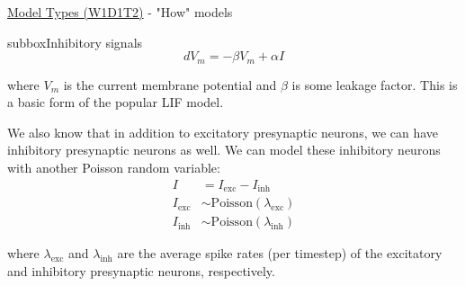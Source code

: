 \begin{textbox}{\href{https://compneuro.neuromatch.io/tutorials/W1D1_ModelTypes/student/W1D1_Tutorial2.html}{Model Types (W1D1T2)} -  "How" models}
\begin{subbox}{subbox}{Inhibitory signals}
\begin{equation}
dV_m = -{\beta}V_m + {\alpha}I
\end{equation}

where $V_m$ is the current membrane potential and $\beta$ is some leakage factor. This is a basic form of the popular LIF model.

We also know that in addition to excitatory presynaptic neurons, we can have inhibitory presynaptic neurons as well. We can model these inhibitory neurons with another Poisson random variable:
\begin{align}
I &= I_{\mathrm{exc}} - I_{\mathrm{inh}} \\
I_{\mathrm{exc}} &\sim \mathrm{Poisson}(\lambda_{\mathrm{exc}}) \\
I_{\mathrm{inh}} &\sim \mathrm{Poisson}(\lambda_{\mathrm{inh}})
\end{align}

where $\lambda_{\mathrm{exc}}$ and $\lambda_{\mathrm{inh}}$ are the average spike rates (per timestep) of the excitatory and inhibitory presynaptic neurons, respectively.

\end{subbox}
\end{textbox}
